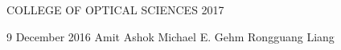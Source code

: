 \documentclass[dissertation,CC]{uathesis}
\begin{document}
	
	
\maketitlepage
{COLLEGE OF OPTICAL SCIENCES} %
{2017}	

\approval
{9 December 2016}		%
{Amit Ashok}  		%
{Michael E. Gehm}	%
{Rongguang Liang}	%


\statementbyauthor



\tableofcontents

\listoffigures











\begin{appendices}
	
	
	
	
	
	
	
\end{appendices}


\renewcommand{\baselinestretch}{1}		%
\small\normalsize						%

\printglossaries



\end{document}
